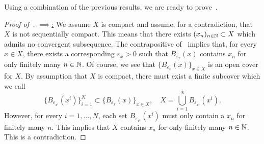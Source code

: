 Using a combination of the previous results, we are ready to prove~.
\begin{proof}[Proof of~]
	\ul{$\implies$:} We assume $X$ is compact and assume, for a contradiction, that $X$ is not sequentially compact. This means that there exists $(x_n)_{n\in\mathbb{N}}\subset X$ which admits no convergent subsequence. The contrapositive of~ implies that, for every $x\in X$, there exists a corresponding $\varepsilon_x>0$ such that $B_{\varepsilon_x}(x)$ contains $x_n$ for only finitely many $n\in\mathbb{N}$. Of course, we see that $\{B_{\varepsilon_x}(x)\}_{x\in X}$ is an open cover for $X$. By assumption that $X$ is compact, there must exist a finite subcover which we call
	\[
	\{B_{\varepsilon_{x^i}}(x^i)\}_{i=1}^N\subset \{B_{\varepsilon_x}(x)\}_{x\in X},\quad X = \bigcup_{i=1}^NB_{\varepsilon_{x^i}}(x^i).
	\]
However, for every $i=1,\dots, N$, each set $B_{\varepsilon_{x^i}}(x^i)$ must only contain a  $x_n$ for finitely many $n$. This implies that $X$ contains $x_n$ for only finitely many $n\in\mathbb{N}$. This is a contradiction.
%	
	

\end{proof}
